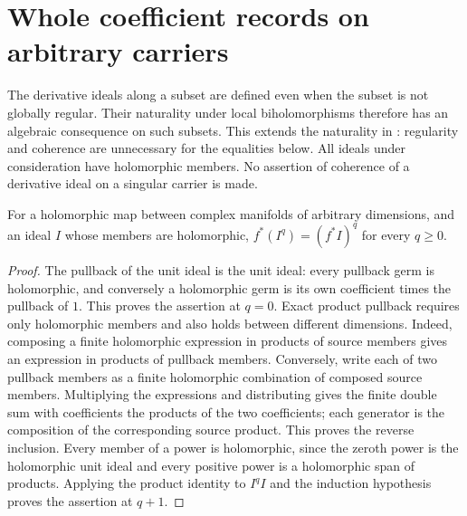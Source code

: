 \section{Whole coefficient records on arbitrary carriers}

The derivative ideals along a subset are defined even when the subset
is not globally regular. Their naturality under local biholomorphisms
therefore has an algebraic consequence on such subsets. This extends
the naturality in : regularity and
coherence are unnecessary for the equalities below. All ideals under
consideration have holomorphic members. No assertion of coherence of a
derivative ideal on a singular carrier is made.

\begin{lemma}
\label{hir:actual-holomorphic-power-pullback}
\leanok
For a holomorphic map between complex manifolds of arbitrary dimensions,
and an ideal $I$ whose members are holomorphic,
$f^*(I^q)=(f^*I)^q$ for every $q\geq0$.
\end{lemma}
\begin{proof}
The pullback of the unit ideal is the unit ideal: every pullback germ
is holomorphic, and conversely a holomorphic germ is its own coefficient
times the pullback of $1$. This proves the assertion at $q=0$.
Exact product pullback requires only holomorphic members and also holds between different dimensions. Indeed,
composing a finite holomorphic expression in products of source members
gives an expression in products of pullback members. Conversely, write
each of two pullback members as a finite holomorphic combination of
composed source members. Multiplying the expressions and distributing
gives the finite double sum with coefficients the products of the two
coefficients; each generator is the composition of the corresponding
source product. This proves the reverse inclusion. Every member of a
power is holomorphic, since the zeroth power is the holomorphic unit
ideal and every positive power is a holomorphic span of products.
Applying the product identity to $I^q I$ and the induction hypothesis
proves the assertion at $q+1$.
\end{proof}

